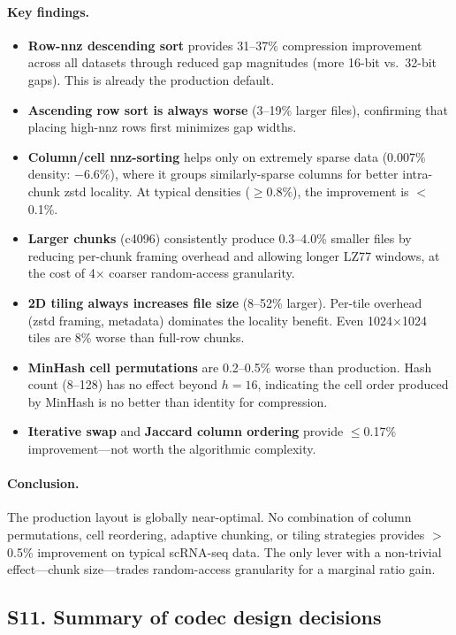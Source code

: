 \documentclass[10pt,twocolumn,letterpaper]{article}
\begin{document}
\paragraph{Key findings.}
\begin{itemize}
\item \textbf{Row-nnz descending sort} provides 31--37\% compression improvement across all datasets through reduced gap magnitudes (more 16-bit vs.\ 32-bit gaps). This is already the production default.
\item \textbf{Ascending row sort is always worse} (3--19\% larger files), confirming that placing high-nnz rows first minimizes gap widths.
\item \textbf{Column/cell nnz-sorting} helps only on extremely sparse data (0.007\% density: $-$6.6\%), where it groups similarly-sparse columns for better intra-chunk zstd locality. At typical densities ($\geq$0.8\%), the improvement is $<$0.1\%.
\item \textbf{Larger chunks} (c4096) consistently produce 0.3--4.0\% smaller files by reducing per-chunk framing overhead and allowing longer LZ77 windows, at the cost of 4$\times$ coarser random-access granularity.
\item \textbf{2D tiling always increases file size} (8--52\% larger). Per-tile overhead (zstd framing, metadata) dominates the locality benefit. Even 1024$\times$1024 tiles are 8\% worse than full-row chunks.
\item \textbf{MinHash cell permutations} are 0.2--0.5\% worse than production. Hash count (8--128) has no effect beyond $h = 16$, indicating the cell order produced by MinHash is no better than identity for compression.
\item \textbf{Iterative swap} and \textbf{Jaccard column ordering} provide $\leq$0.17\% improvement---not worth the algorithmic complexity.
\end{itemize}

\paragraph{Conclusion.}
The production layout is globally near-optimal. No combination of column permutations, cell reordering, adaptive chunking, or tiling strategies provides $>$0.5\% improvement on typical scRNA-seq data. The only lever with a non-trivial effect---chunk size---trades random-access granularity for a marginal ratio gain.

\subsection*{S11. Summary of codec design decisions}
\end{document}
